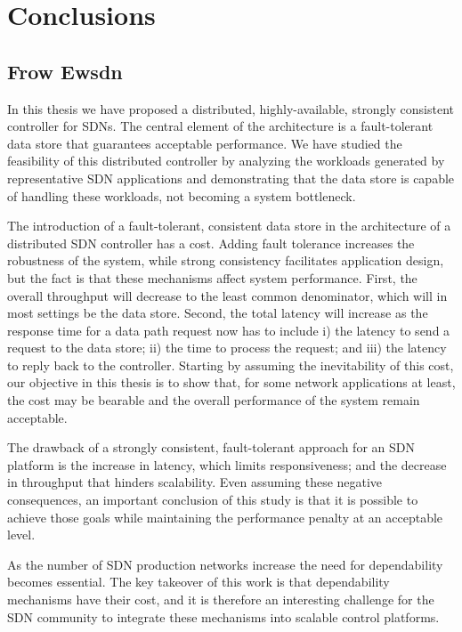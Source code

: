 \section{Conclusions}
\subsection{Frow Ewsdn}
In this thesis we have proposed a distributed, highly-available, strongly consistent controller for SDNs.
The central element of the architecture is a fault-tolerant data store that guarantees acceptable performance.
We have studied the feasibility of this distributed controller by analyzing  the workloads generated by representative SDN applications and demonstrating that the data store is capable of handling these workloads, not becoming a system bottleneck.

The introduction of a fault-tolerant, consistent data store in the architecture of a distributed SDN controller has a cost.
Adding fault tolerance increases the robustness of the system, while strong consistency facilitates application design, but the fact is that these mechanisms affect system performance.
First, the overall throughput will decrease to the least common denominator, which will in most settings be the data store.
Second, the total latency will increase as the response time for a data path request now has to include i) the latency to send a request to the data store; ii) the time to process the request; and iii) the latency to reply back to the controller.
Starting by assuming the inevitability of this cost, our objective in this thesis is to show that, for some network applications at least, the cost may be bearable and the overall performance of the system remain acceptable.

The drawback of a strongly consistent, fault-tolerant approach for an SDN platform is the increase in latency, which limits responsiveness; and the decrease in throughput that hinders scalability.
Even assuming these negative consequences, an important conclusion of this study is that it is possible to achieve those goals while maintaining the performance penalty at an acceptable level.

As the number of SDN production networks increase the need for dependability becomes essential. The key takeover of this work is that dependability mechanisms have their cost, and it is therefore an interesting challenge for the SDN community to integrate these mechanisms into scalable control platforms. 

